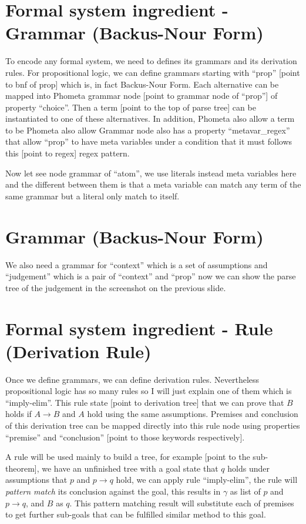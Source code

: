 \documentclass[11pt, a4paper]{article}
\begin{document}
\section{Formal system ingredient - Grammar (Backus-Nour Form)}

To encode any formal system, we need to defines its grammars and its derivation
rules. For propositional logic, we can define grammars starting with ``prop''
[point to bnf of prop] which is, in fact Backus-Nour Form. Each alternative can
be mapped into Phometa grammar node [point to grammar node of ``prop''] of
property ``choice''. Then a term [point to the top of parse tree] can be
instantiated to one of these alternatives. In addition, Phometa also allow a
term to be Phometa also allow Grammar node also has a property
``metavar\_regex'' that allow ``prop'' to have meta variables under a condition
that it must follows this [point to regex] regex pattern.

Now let see node grammar of ``atom'', we use literals instead meta variables
here and the different between them is that a meta variable can match any term
of the same grammar but a literal only match to itself.

\section{Grammar (Backus-Nour Form)}

We also need a grammar for ``context'' which is a set of assumptions and
``judgement'' which is a pair of ``context'' and ``prop'' now we can show the
parse tree of the judgement in the screenshot on the previous slide.

\section{Formal system ingredient - Rule (Derivation Rule)}

Once we define grammars, we can define derivation rules. Nevertheless
propositional logic has so many rules so I will just explain one of them which
is ``imply-elim''. This rule state [point to derivation tree] that we can prove
that $B$ holds if $A \rightarrow B$ and $A$ hold using the same assumptions.
Premises and conclusion of this derivation tree can be mapped directly into this
rule node using properties ``premise'' and ``conclusion'' [point to those
keywords respectively].

A rule will be used mainly to build a tree, for example [point to the
sub-theorem], we have an unfinished tree with a goal state that $q$ holds under
assumptions that $p$ and $p \rightarrow q$ hold, we can apply rule
``imply-elim'', the rule will \emph{pattern match} its conclusion against the
goal, this results in $\gamma$ as list of $p$ and $p \rightarrow q$, and $B$ as
$q$. This pattern matching result will substitute each of premises to get
further sub-goals that can be fulfilled similar method to this goal.
\end{document}
